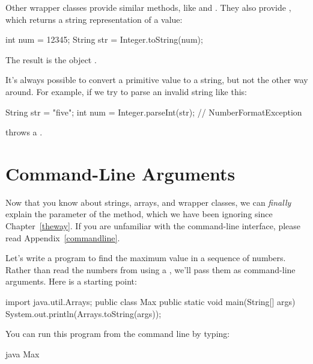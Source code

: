 Other wrapper classes provide similar methods, like  and .
They also provide , which returns a string representation of a value:

\begin{code}
int num = 12345;
String str = Integer.toString(num);
\end{code}

The result is the  object .


It's always possible to convert a primitive value to a string, but not the other way around.  For example, if we try to parse an invalid string like this:

\begin{code}
String str = "five";
int num = Integer.parseInt(str);  // NumberFormatException
\end{code}

 throws a .


\section{Command-Line Arguments}


Now that you know about strings, arrays, and wrapper classes, we can {\em finally} explain the  parameter of the  method, which we have been ignoring since Chapter~\ref{theway}.
If you are unfamiliar with the command-line interface, please read Appendix~\ref{commandline}.

Let's write a program to find the maximum value in a sequence of numbers.
Rather than read the numbers from  using a , we'll pass them as command-line arguments.
Here is a starting point:

\begin{code}
import java.util.Arrays;
public class Max {
    public static void main(String[] args) {
        System.out.println(Arrays.toString(args));
    }
}
\end{code}

You can run this program from the command line by typing:

\begin{stdout}
java Max
\end{stdout}

